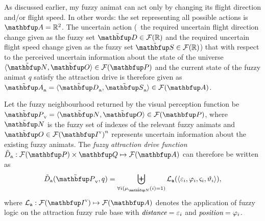 As discussed earlier, my fuzzy animat can act only by changing its flight direction and/or flight speed. In other words: the set representing all possible actions is $\set{A}=\R^2$. The uncertain action (\ie\ the required uncertain flight direction change given as the fuzzy set $\fset{D} \in \fpowset{\R}$ and the required uncertain flight speed change given as the fuzzy set $\fset{S} \in \fpowset{\R}$) that with respect to the perceived uncertain information about the state of the universe $\langle \fset{N}, \fset{O} \rangle \in \fpowset{\set{P}}$ and the current state of the fuzzy animat $q$ satisfy the attraction drive is therefore given as $\fset{A}_\textnormal{a}=\langle \fset{D}_\textnormal{a}, \fset{S}_\textnormal{a} \rangle \in \fpowset{\set{A}}$.

\begin{definition}
\label{def:fuzzyAnimat:Da:afd} 
Let the fuzzy neighbourhood returned by the visual perception function be $\fset{P}_\textnormal{v}=\langle \fset{N}, \fset{O} \rangle \in \fpowset{\set{P}}$, where $\fset{N}$ is the fuzzy set of indexes of the relevant fuzzy animats and $\fset{O} \in \fpowset{\set{I}^\textnormal{v}}^n$ represents uncertain information about the existing fuzzy animats. The \emph{fuzzy attraction drive function} $\ffunc{D}_\textnormal{a}: \fpowset{\set{P}} \times \set{Q} \mapsto \fpowset{\set{A}}$ can therefore be written as
\begin{equation}
\ffunc{D}_\textnormal{a}(\fset{P}_\textnormal{v},q)=%
 \biguplus_{\forall i(\mu_\fset{N}(i)=1)} \mathcal{L}_\texttt{a}(\langle \varepsilon_i, \varphi_i, \varsigma_i, \vartheta_i \rangle),
\end{equation}
where $\mathcal{L}_\texttt{a}: \fpowset{\set{I}^\textnormal{v}} \mapsto \fpowset{\set{A}}$ denotes the application of fuzzy logic on the attraction fuzzy rule base with $\emph{distance}=\varepsilon_i$ and $\emph{position}=\varphi_i$.
\end{definition}

